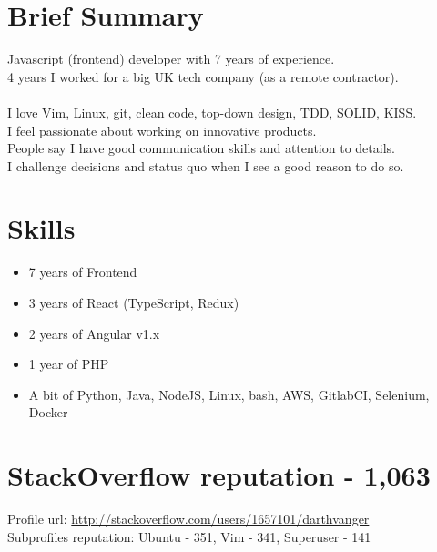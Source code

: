 \documentclass[a4paper, 14pt]{article}
\begin{document}
\begin{center}
	\textsc{\Huge{}}
\end{center}


\section{Brief Summary}
  Javascript (frontend) developer with 7 years of experience.  \\
  4 years I worked for a big UK tech company (as a remote contractor). \\
  \\
  I love Vim, Linux, git, clean code, top-down design, TDD, SOLID, KISS. \\
  I feel passionate about working on innovative products. \\
  People say I have good communication skills and attention to details. \\
  I challenge decisions and status quo when I see a good reason to do so.

\section{Skills}
  \begin{itemize}
    \item 7 years of Frontend  \\
    \item 3 years of React (TypeScript, Redux) \\
    \item 2 years of Angular v1.x \\ 
    \item 1 year of PHP \\
    \item A bit of Python, Java, NodeJS, Linux, bash, AWS, GitlabCI, Selenium, Docker
  \end{itemize}

\section{StackOverflow reputation - 1,063}
  Profile url: \url{http://stackoverflow.com/users/1657101/darthvanger} \\
  Subprofiles reputation: Ubuntu - 351, Vim - 341, Superuser - 141
\end{document}
